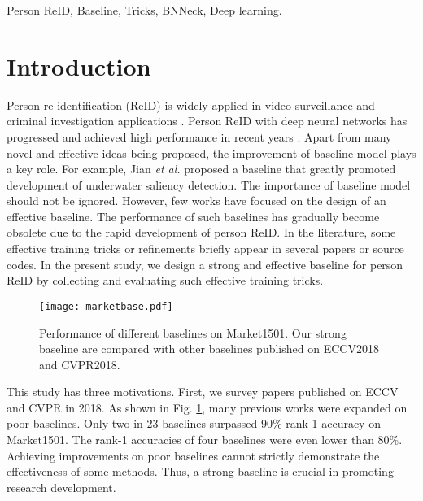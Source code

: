 \documentclass[journal]{IEEEtran}
\begin{document}
\begin{IEEEkeywords}
Person ReID, Baseline, Tricks, BNNeck, Deep learning.
\end{IEEEkeywords}

\IEEEpeerreviewmaketitle



\section{Introduction}
Person re-identification (ReID) is widely applied in video surveillance and criminal investigation applications \cite{wang2019incremental}.
Person ReID with deep neural networks has progressed and achieved high performance in recent years \cite{LUO2019,wang2018mancs,sun2018beyond}.
Apart from many novel and effective ideas being proposed, the improvement of baseline model plays a key role.
For example, Jian \emph{et al.} \cite{jian2019extended,jian2018integrating} proposed a baseline that greatly promoted development of underwater saliency detection.
The importance of baseline model should not be ignored. However, few works \cite{zheng2018discriminatively,xiong2019good,sun2018beyond} have focused on the design of an effective baseline. The performance of such baselines has gradually become obsolete due to the rapid development of person ReID. In the literature, some effective training tricks or refinements briefly appear in several papers or source codes. In the present study, we design a strong and effective baseline for person ReID by collecting and evaluating such effective training tricks.





\begin{figure}[htb]
\centering
\texttt{[image: marketbase.pdf]}
\caption{Performance of different baselines on Market1501. Our strong baseline are compared with other baselines published on ECCV2018 and CVPR2018.}
\label{fig:baseline}
\end{figure}


This study has three motivations. First, we survey papers published on ECCV and CVPR in 2018.
As shown in Fig. \ref{fig:baseline}, many previous works were expanded on poor baselines. Only two in 23 baselines surpassed 90\% rank-1 accuracy on Market1501.
The rank-1 accuracies of four baselines were even lower than 80\%.
Achieving improvements on poor baselines cannot strictly demonstrate the effectiveness of some methods. Thus, a strong baseline is crucial in promoting research development.
\end{document}
